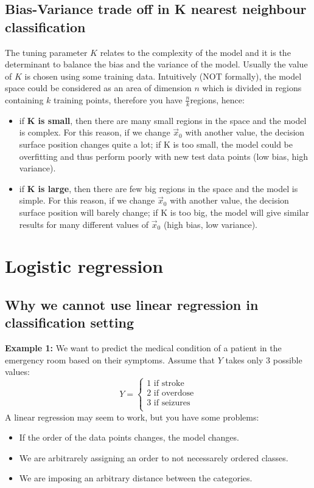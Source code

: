 
    \subsection{Bias-Variance trade off in K nearest neighbour classification}
      The tuning parameter $K$ relates to the complexity of the model and it is the determinant to balance the bias and the variance of the model. Usually the value of $K$ is chosen using some training data. 
      Intuitively (NOT formally), the model space could be considered as an area of dimension $n$ which is divided in regions containing $k$ training points, therefore you have $\frac{n}{k}$regions, hence:
      \begin{itemize}
        \item if \textbf{K is small}, then there are many small regions in the space and the model is complex. For this reason, if we change $\vec{x}_0$ with another value, the decision surface position changes quite a lot; if K is too small, the model could be overfitting and thus perform poorly with new test data points (low bias, high variance).
        \item if \textbf{K is large}, then there are few big regions in the space and the model is simple. For this reason, if we change $\vec{x}_0$ with another value, the decision surface position will barely change; if K is too big, the model will give similar results for many different values of $\vec{x}_0$ (high bias, low variance).
      \end{itemize}


  \section{Logistic regression}
    \subsection{Why we cannot use linear regression in classification setting}
    \textbf{Example 1:} We want to predict the medical condition of a patient in the emergency room based on their symptoms. Assume that $Y$ takes only 3 possible values:
    $$
    Y = \begin{cases}
          1 \text{ if stroke} \\
	      2 \text{ if overdose} \\
	      3 \text{ if seizures} \\
        \end{cases}
    $$
    A linear regression may seem to work, but you have some problems:
    \begin{itemize}
      \item If the order of the data points changes, the model changes.
      \item We are arbitrarely assigning an order to not necessarely ordered classes.
      \item We are imposing an arbitrary distance between the categories. 
    \end{itemize}

